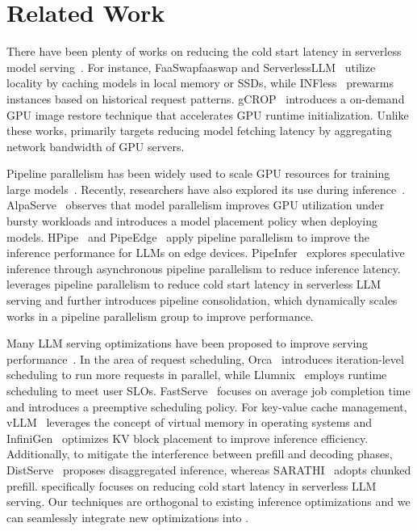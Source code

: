 \section{Related Work}
\label{sec:related}


There have been plenty of works on reducing the cold start latency in serverless model serving~\cite{infaas, infless, asyfunc, faaswap, serverlessllm}.
For instance, FaaSwap{faaswap} and ServerlessLLM~\cite{serverlessllm} utilize locality by caching models in local memory or SSDs,
while INFless~\cite{infless} prewarms instances based on historical request patterns.
gCROP~\cite{gcrop} introduces a on-demand GPU image restore technique that accelerates GPU runtime initialization.
Unlike these works, \sysname primarily targets reducing model fetching latency by aggregating network bandwidth of GPU servers.

Pipeline parallelism has been widely used to scale GPU resources for training large models~\cite{huang2019gpipe, terapipe, narayanan2019pipedream, nips18_pipesgd, nips22_sapipe, megascale}.
Recently, researchers have also explored its use during inference~\cite{li2023alpaserve, hpipe, pipeinfer, pipeedge}.
AlpaServe~\cite{li2023alpaserve} observes that model parallelism improves GPU utilization under bursty workloads and introduces a model placement policy when deploying models.
HPipe~\cite{hpipe} and PipeEdge~\cite{pipeedge} apply pipeline parallelism to improve the inference performance for LLMs on edge devices.
PipeInfer~\cite{pipeinfer} explores speculative inference through asynchronous pipeline parallelism to reduce inference latency.
\sysname leverages pipeline parallelism to reduce cold start latency in serverless LLM serving and
further introduces pipeline consolidation, which dynamically scales works in a pipeline parallelism group to improve performance.

Many LLM serving optimizations have been proposed to improve serving performance~\cite{li2023alpaserve, fastserve, loongserve, distserve, orca, vllm, infinigen, llumnix, sarathi, serverlessllm}.
In the area of request scheduling, Orca~\cite{orca} introduces iteration-level scheduling to run more requests in parallel,
while Llumnix~\cite{llumnix} employs runtime scheduling to meet user SLOs.
FastServe~\cite{fastserve} focuses on average job completion time and introduces a preemptive scheduling policy.
For key-value cache management,
vLLM~\cite{vllm} leverages the concept of virtual memory in operating systems and InfiniGen~\cite{infinigen} optimizes KV block placement to improve inference efficiency.
Additionally, to mitigate the interference between prefill and decoding phases, DistServe~\cite{distserve} proposes disaggregated inference,
whereas SARATHI~\cite{sarathi} adopts chunked prefill.
\sysname specifically focuses on reducing cold start latency in serverless LLM serving.
Our techniques are orthogonal to existing inference optimizations and we can seamlessly integrate new optimizations into \sysname.